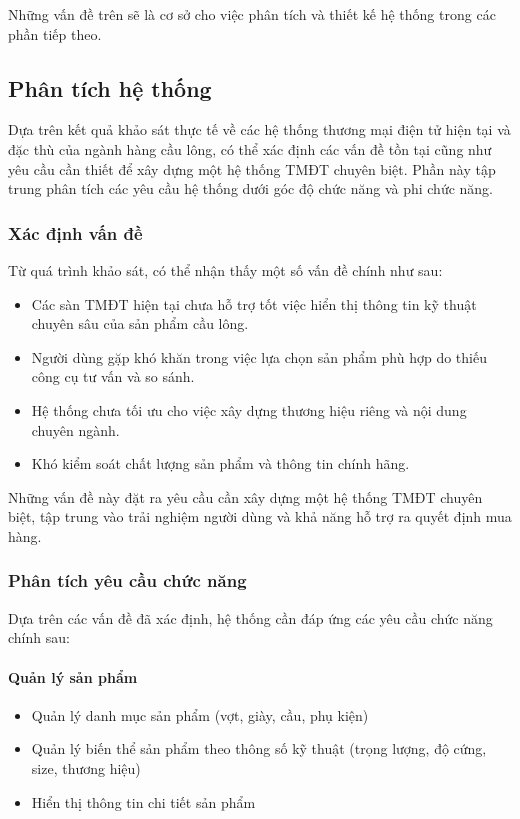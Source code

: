 \documentclass[13pt]{article}
\begin{document}
Những vấn đề trên sẽ là cơ sở cho việc phân tích và thiết kế hệ thống trong các phần tiếp theo.
\subsection{Phân tích hệ thống}

Dựa trên kết quả khảo sát thực tế về các hệ thống thương mại điện tử hiện tại và đặc thù của ngành hàng cầu lông, có thể xác định các vấn đề tồn tại cũng như yêu cầu cần thiết để xây dựng một hệ thống TMĐT chuyên biệt. Phần này tập trung phân tích các yêu cầu hệ thống dưới góc độ chức năng và phi chức năng.

\subsubsection{Xác định vấn đề}

Từ quá trình khảo sát, có thể nhận thấy một số vấn đề chính như sau:

\begin{itemize}
    \item Các sàn TMĐT hiện tại chưa hỗ trợ tốt việc hiển thị thông tin kỹ thuật chuyên sâu của sản phẩm cầu lông.
    \item Người dùng gặp khó khăn trong việc lựa chọn sản phẩm phù hợp do thiếu công cụ tư vấn và so sánh.
    \item Hệ thống chưa tối ưu cho việc xây dựng thương hiệu riêng và nội dung chuyên ngành.
    \item Khó kiểm soát chất lượng sản phẩm và thông tin chính hãng.
\end{itemize}

Những vấn đề này đặt ra yêu cầu cần xây dựng một hệ thống TMĐT chuyên biệt, tập trung vào trải nghiệm người dùng và khả năng hỗ trợ ra quyết định mua hàng.

\subsubsection{Phân tích yêu cầu chức năng}

Dựa trên các vấn đề đã xác định, hệ thống cần đáp ứng các yêu cầu chức năng chính sau:

\paragraph{Quản lý sản phẩm}
\begin{itemize}
    \item Quản lý danh mục sản phẩm (vợt, giày, cầu, phụ kiện)
    \item Quản lý biến thể sản phẩm theo thông số kỹ thuật (trọng lượng, độ cứng, size, thương hiệu)
    \item Hiển thị thông tin chi tiết sản phẩm
\end{itemize}
\end{document}
